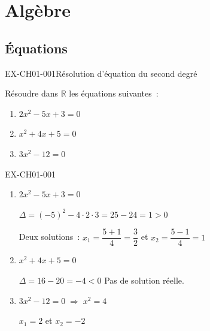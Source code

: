 \chapter{Algèbre}

\section{Équations}
\begin{exercice}{EX-CH01-001}{Résolution d'équation du second degré}

Résoudre dans $\mathbb{R}$ les équations suivantes~:

\begin{enumerate}[label=\alph*)]
  \item $2x^2 - 5x + 3 = 0$
  \item $x^2 + 4x + 5 = 0$
  \item $3x^2 - 12 = 0$
\end{enumerate}

\end{exercice}
\begin{solution}{EX-CH01-001}

\begin{enumerate}[label=\alph*)]

  \item $2x^2 - 5x + 3 = 0$

  $\Delta = (-5)^2 - 4 \cdot 2 \cdot 3 = 25 - 24 = 1 > 0$

  Deux solutions~: $x_1 = \dfrac{5+1}{4} = \dfrac{3}{2}$ \quad et \quad
  $x_2 = \dfrac{5-1}{4} = 1$

  \item $x^2 + 4x + 5 = 0$

  $\Delta = 16 - 20 = -4 < 0$ \quad Pas de solution réelle.

  \item $3x^2 - 12 = 0 \;\Rightarrow\; x^2 = 4$

  $x_1 = 2$ \quad et \quad $x_2 = -2$

\end{enumerate}

\end{solution}
